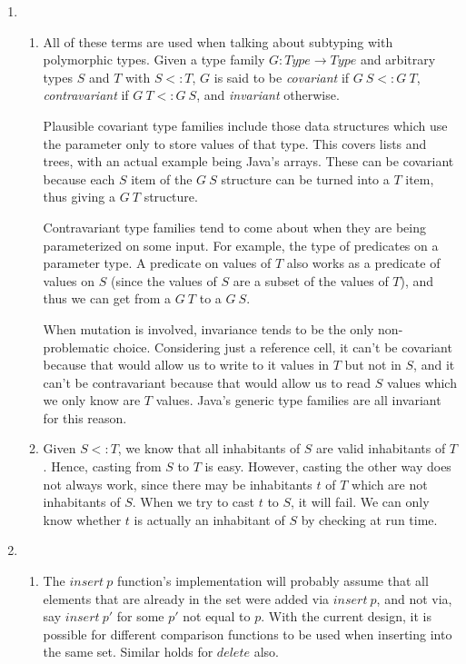 \documentclass{article}
\begin{document}
\begin{enumerate}
\begin{enumerate}
\begin{enumerate}
        \end{enumerate}
    \end{enumerate}
  \item
    \begin{enumerate}
      \item
        All of these terms are used when talking about subtyping with polymorphic types. Given a type family $G : \mathit{Type} \to \mathit{Type}$ and arbitrary types $S$ and $T$ with $S <: T$, $G$ is said to be \textit{covariant} if $G~S <: G~T$, \textit{contravariant} if $G~T <: G~S$, and \textit{invariant} otherwise.

        Plausible covariant type families include those data structures which use the parameter only to store values of that type. This covers lists and trees, with an actual example being Java's arrays. These can be covariant because each $S$ item of the $G~S$ structure can be turned into a $T$ item, thus giving a $G~T$ structure.

        Contravariant type families tend to come about when they are being parameterized on some input. For example, the type of predicates on a parameter type. A predicate on values of $T$ also works as a predicate of values on $S$ (since the values of $S$ are a subset of the values of $T$), and thus we can get from a $G~T$ to a $G~S$.

        When mutation is involved, invariance tends to be the only non-problematic choice. Considering just a reference cell, it can't be covariant because that would allow us to write to it values in $T$ but not in $S$, and it can't be contravariant because that would allow us to read $S$ values which we only know are $T$ values. Java's generic type families are all invariant for this reason.
      \item Given $S <: T$, we know that all inhabitants of $S$ are valid inhabitants of $T$. Hence, casting from $S$ to $T$ is easy. However, casting the other way does not always work, since there may be inhabitants $t$ of $T$ which are not inhabitants of $S$. When we try to cast $t$ to $S$, it will fail. We can only know whether $t$ is actually an inhabitant of $S$ by checking at run time.
    \end{enumerate}
  \item
    \begin{enumerate}
      \item
        The $\mathit{insert}~p$ function's implementation will probably assume that all elements that are already in the set were added via $\mathit{insert}~p$, and not via, say $\mathit{insert}~p'$ for some $p'$ not equal to $p$. With the current design, it is possible for different comparison functions to be used when inserting into the same set. Similar holds for $\mathit{delete}$ also.


\end{enumerate}
\end{enumerate}
\end{document}
